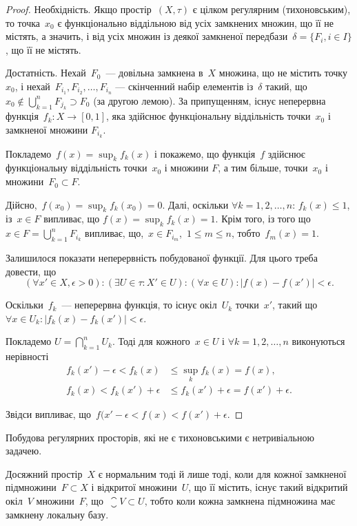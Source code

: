 \begin{proof}
Необхідність. Якщо простір~$(X, \tau)$ є
цілком регулярним (тихоновським), то точка~$x_0$ є
функціонально віддільною від усіх замкнених множин, що її
не містять, а значить, і від усіх множин із деякої замкненої
передбази~$\delta = \{F_i, i \in I\}$, що її не містять.

Достатність. Нехай~$F_0$~--- довільна замкнена в~$X$
множина, що не містить точку~$x_0$, і нехай~$F_{i_1}, F_{i_2}, \ldots, F_{i_n}$ ---
скінченний набір елементів із~$\delta$ такий, що
$x_0 \notin \bigcup_{k = 1}^n F_{j_k} \supset F_0$ (за другою лемою).
За припущенням, існує неперервна функція~$f_k: X \to [0, 1]$, яка здійснює
функціональну віддільність точки~$x_0$ і замкненої множини
$F_{i_k}$.

Покладемо~$f(x) = \sup_k f_k(x)$ і покажемо, що функція~$f$
здійснює функціональну віддільність точки~$x_0$ і множини
$F$, а тим більше, точки~$x_0$ і множини~$F_0 \subset F$.

Дійсно,~$f(x_0) = \sup_k f_k(x_0) = 0$. Далі, оскільки
$\forall k = 1, 2, \ldots, n$: $f_k(x) \le 1$, із~$x \in F$ випливає, що
$f(x) = \sup_k f_k(x) = 1$. Крім того, із того що
$x \in F = \bigcup_{k = 1}^n F_{i_k}$
випливає, що,~$x \in F_{i_m}$,~$1 \le m \le n$, тобто~$f_m(x) = 1$.

Залишилося показати неперервність побудованої функції.
Для цього треба довести, що \[ (\forall x' \in X, \epsilon > 0): (\exists U \in \tau: X' \in U): (\forall x \in U): |f(x) - f(x')| < \epsilon. \]

Оскільки~$f_k$~--- неперервна функція, то існує окіл~$U_k$ точки~$x'$, такий що
$\forall x \in U_k: |f_k(x) - f_k(x')| < \epsilon$.

Покладемо
$U = \bigcap_{k = 1}^n U_k$. Тоді для кожного~$x \in U$ і
$\forall k = 1, 2, \ldots, n$ виконуються нерівності
\begin{align*}
f_k(x') - \epsilon < f_k(x) &\le \sup_k f_k(x) = f(x), \\
f_k(x) < f_k(x') + \epsilon &\le f_k(x') + \epsilon = f(x') + \epsilon.
\end{align*}

Звідси випливає, що~$f(x' - \epsilon < f(x) < f(x') + \epsilon$.
\end{proof}

\begin{remark}
Побудова регулярних просторів, які не є
тихоновськими є нетривіальною задачею.
\end{remark}

\begin{theorem}
Досяжний простір~$X$ є нормальним тоді й лише тоді, коли
для кожної замкненої підмножини~$F \subset X$ і відкритої
множини~$U$, що її містить, існує такий відкритий окіл~$V$
множини~$F$, що~$\closure{V} \subset U$, тобто коли кожна замкнена
підмножина має замкнену локальну базу.
\end{theorem}

